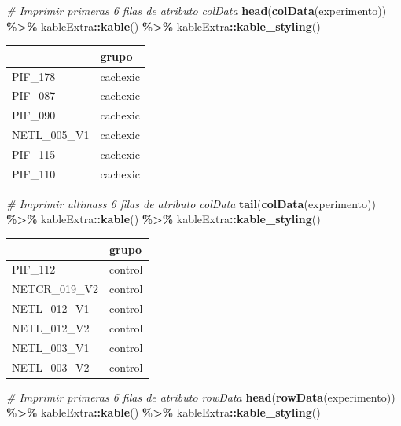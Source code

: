 \documentclass[
]{article}
\newenvironment{Shaded}{\begin{snugshade}}{\end{snugshade}}
\newcommand{\CommentTok}[1]{\textcolor[rgb]{0.56,0.35,0.01}{\textit{#1}}}
\newcommand{\FunctionTok}[1]{\textcolor[rgb]{0.13,0.29,0.53}{\textbf{#1}}}
\newcommand{\NormalTok}[1]{#1}
\newcommand{\SpecialCharTok}[1]{\textcolor[rgb]{0.81,0.36,0.00}{\textbf{#1}}}
\begin{document}
\begin{Shaded}
\begin{Highlighting}[]
\CommentTok{\# Imprimir primeras 6 filas de atributo colData}
\FunctionTok{head}\NormalTok{(}\FunctionTok{colData}\NormalTok{(experimento)) }\SpecialCharTok{\%\textgreater{}\%}
\NormalTok{  kableExtra}\SpecialCharTok{::}\FunctionTok{kable}\NormalTok{() }\SpecialCharTok{\%\textgreater{}\%}
\NormalTok{  kableExtra}\SpecialCharTok{::}\FunctionTok{kable\_styling}\NormalTok{()}
\end{Highlighting}
\end{Shaded}

\begin{longtable}[t]{ll}
\toprule
 & grupo\\
\midrule
PIF\_178 & cachexic\\
PIF\_087 & cachexic\\
PIF\_090 & cachexic\\
NETL\_005\_V1 & cachexic\\
PIF\_115 & cachexic\\
\addlinespace
PIF\_110 & cachexic\\
\bottomrule
\end{longtable}

\begin{Shaded}
\begin{Highlighting}[]
\CommentTok{\# Imprimir ultimass 6 filas de atributo colData}
\FunctionTok{tail}\NormalTok{(}\FunctionTok{colData}\NormalTok{(experimento)) }\SpecialCharTok{\%\textgreater{}\%}
\NormalTok{  kableExtra}\SpecialCharTok{::}\FunctionTok{kable}\NormalTok{() }\SpecialCharTok{\%\textgreater{}\%}
\NormalTok{  kableExtra}\SpecialCharTok{::}\FunctionTok{kable\_styling}\NormalTok{()}
\end{Highlighting}
\end{Shaded}

\begin{longtable}[t]{ll}
\toprule
 & grupo\\
\midrule
PIF\_112 & control\\
NETCR\_019\_V2 & control\\
NETL\_012\_V1 & control\\
NETL\_012\_V2 & control\\
NETL\_003\_V1 & control\\
\addlinespace
NETL\_003\_V2 & control\\
\bottomrule
\end{longtable}

\begin{Shaded}
\begin{Highlighting}[]
\CommentTok{\# Imprimir primeras 6 filas de atributo rowData}
\FunctionTok{head}\NormalTok{(}\FunctionTok{rowData}\NormalTok{(experimento)) }\SpecialCharTok{\%\textgreater{}\%}
\NormalTok{  kableExtra}\SpecialCharTok{::}\FunctionTok{kable}\NormalTok{() }\SpecialCharTok{\%\textgreater{}\%}
\NormalTok{  kableExtra}\SpecialCharTok{::}\FunctionTok{kable\_styling}\NormalTok{()}
\end{Highlighting}
\end{Shaded}
\end{document}
